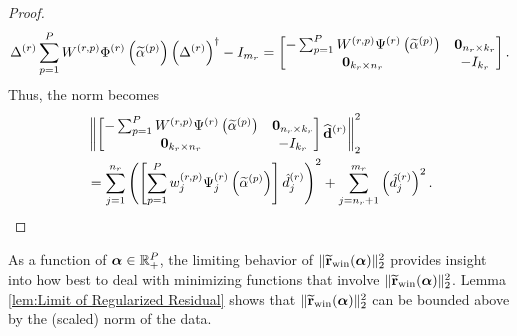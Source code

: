 \documentclass[12pt]{article}
\begin{document}
\begin{proof}
\[\Delta^{(r)}\sum_{p=1}^{P} W^{(r,p)}\Phi^{(r)}\left(\widetilde{\alpha}^{(p)}\right){\left(\Delta^{(r)}\right)}^\dagger - I_{m_r} = \begin{bmatrix}
-\sum_{p=1}^{P} W^{(r,p)} \Psi^{(r)}\left(\widetilde{\alpha}^{(p)}\right) & \bm{0}_{n_r \times k_r} \\
\bm{0}_{k_r \times n_r} & -I_{k_r}
\end{bmatrix}.\]
Thus, the norm becomes
\begin{align*}
    &\left\|\begin{bmatrix}
-\sum_{p=1}^{P} W^{(r,p)} \Psi^{(r)}\left(\widetilde{\alpha}^{(p)}\right) & \bm{0}_{n_r \times k_r} \\
\bm{0}_{k_r \times n_r} & -I_{k_r}
\end{bmatrix}\widehat{\mathbf{d}}^{(r)}\right\|_2^2 \\
&= \sum_{j=1}^{n_r} \left(\left[\sum_{p=1}^{P} w_{j}^{(r,p)}\Psi_{j}^{(r)}\left(\widetilde{\alpha}^{(p)}\right)\right] \hat{d}_j^{(r)}\right)^2 + \sum_{j ={n_r}+1}^{m_r} \left(\hat{d}_j^{(r)}\right)^2.
\end{align*}
\end{proof}

As a function of $\bm{\alpha} \in \mathbb{R}_+^P$, the limiting behavior of $\|\widetilde{\mathbf{r}}_{\text{win}}(\bm{\alpha})\|_2^2$ provides insight into how best to deal with minimizing functions that involve $\|\widetilde{\mathbf{r}}_{\text{win}}(\bm{\alpha})\|_2^2$. Lemma \ref{lem:Limit of Regularized Residual} shows that $\|\widetilde{\mathbf{r}}_{\text{win}}(\bm{\alpha})\|_2^2$ can be bounded above by the (scaled) norm of the data.
\end{document}
